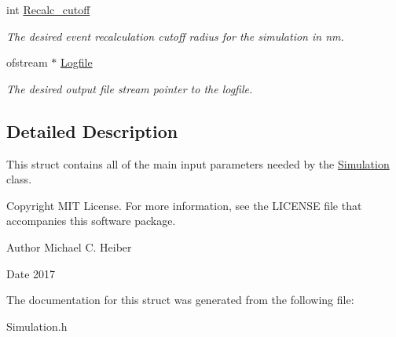 \begin{DoxyCompactItemize}
int \hyperlink{struct_parameters___simulation_af55371ca9e7027e799f5be46e40eacc1}{Recalc\+\_\+cutoff}
\begin{DoxyCompactList}\small\item\em The desired event recalculation cutoff radius for the simulation in nm. \end{DoxyCompactList}\item 
\mbox{\label{struct_parameters___simulation_a89fa968cf21d974e02f10dbe9d7bc54a}} 
ofstream $\ast$ \hyperlink{struct_parameters___simulation_a89fa968cf21d974e02f10dbe9d7bc54a}{Logfile}
\begin{DoxyCompactList}\small\item\em The desired output file stream pointer to the logfile. \end{DoxyCompactList}\end{DoxyCompactItemize}


\subsection{Detailed Description}
This struct contains all of the main input parameters needed by the \hyperlink{class_simulation}{Simulation} class. 

\begin{DoxyCopyright}{Copyright}
M\+IT License. For more information, see the L\+I\+C\+E\+N\+SE file that accompanies this software package. 
\end{DoxyCopyright}
\begin{DoxyAuthor}{Author}
Michael C. Heiber 
\end{DoxyAuthor}
\begin{DoxyDate}{Date}
2017 
\end{DoxyDate}


The documentation for this struct was generated from the following file\+:\begin{DoxyCompactItemize}
\item 
Simulation.\+h\end{DoxyCompactItemize}
